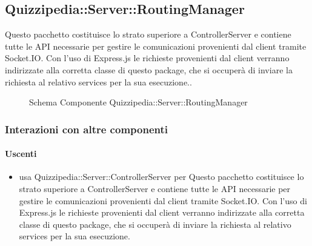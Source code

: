 \subsection{Quizzipedia::Server::RoutingManager}
Questo pacchetto costituisce lo strato superiore a ControllerServer e contiene tutte le API necessarie per gestire le comunicazioni provenienti dal client tramite Socket.IO. 
Con l'uso di Express.js le richieste provenienti dal client verranno indirizzate alla corretta classe di questo package, che si occuperà di inviare la richiesta al relativo services per la sua esecuzione..
\begin{figure}[H]
\centering
\noindent{}
\caption[Schema Componente Quizzipedia::Server::RoutingManager]{Schema Componente Quizzipedia::Server::RoutingManager}
\end{figure}
\subsubsection{Interazioni con altre componenti}
\paragraph{Uscenti}
\begin{itemize}
\item usa Quizzipedia::Server::ControllerServer per Questo pacchetto costituisce lo strato superiore a ControllerServer e contiene tutte le API necessarie per gestire le comunicazioni provenienti dal client tramite Socket.IO. 
Con l'uso di Express.js le richieste provenienti dal client verranno indirizzate alla corretta classe di questo package, che si occuperà di inviare la richiesta al relativo services per la sua esecuzione.
\end{itemize}
